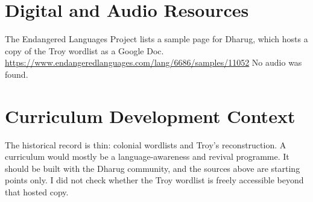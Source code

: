 \documentclass[12pt]{article}
\begin{document}
\section{Digital and Audio Resources}
The Endangered Languages Project lists a sample page for Dharug, which hosts a copy of the Troy wordlist as a Google Doc. \url{https://www.endangeredlanguages.com/lang/6686/samples/11052} No audio was found.

\section{Curriculum Development Context}
The historical record is thin: colonial wordlists and Troy's reconstruction. A curriculum would mostly be a language-awareness and revival programme. It should be built with the Dharug community, and the sources above are starting points only. I did not check whether the Troy wordlist is freely accessible beyond that hosted copy.
\end{document}
